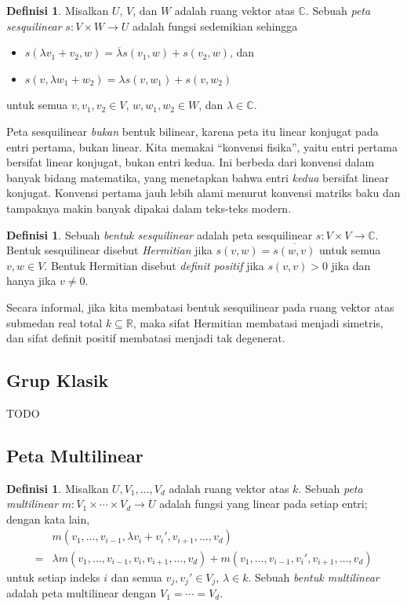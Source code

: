\documentclass[12pt]{article}
\theoremstyle{plain}
\theoremstyle{definition}
\newtheorem{definition}[theorem]{Definisi}
\theoremstyle{remark}
\numberwithin{equation}{section}
\begin{document}
\begin{definition}
Misalkan $U$, $V$, dan $W$ adalah ruang vektor atas $\mathbb{C}$.
Sebuah \emph{peta sesquilinear} $s: V \times W \to U$
adalah fungsi sedemikian sehingga
\begin{itemize}
\item $s(\lambda v_1+v_2,w) = \overline{\lambda} s(v_1,w) + s(v_2,w)$, dan
\item $s(v,\lambda w_1+w_2) = \lambda s(v,w_1) + s(v,w_2)$
\end{itemize}
untuk semua $v,v_1,v_2 \in V$, $w,w_1,w_2 \in W$, dan $\lambda \in \mathbb{C}$.
\end{definition}

Peta sesquilinear \emph{bukan} bentuk bilinear, karena peta itu linear
konjugat pada entri pertama, bukan linear.
Kita memakai “konvensi fisika”, yaitu entri pertama bersifat linear
konjugat, bukan entri kedua. Ini berbeda dari konvensi dalam banyak bidang
matematika, yang menetapkan bahwa entri \emph{kedua} bersifat linear konjugat.
Konvensi pertama jauh lebih alami menurut konvensi matriks baku
dan tampaknya makin banyak dipakai dalam teks-teks modern.

\begin{definition}
Sebuah \emph{bentuk sesquilinear} adalah peta sesquilinear $s: V \times V \to
\mathbb{C}$.
Bentuk sesquilinear disebut \emph{Hermitian} jika $s(v,w)=\overline{s(w,v)}$
untuk semua $v,w \in V$.
Bentuk Hermitian disebut \emph{definit positif} jika $s(v,v) > 0$ jika dan hanya
jika $v \ne 0$.
\end{definition}

Secara informal, jika kita membatasi bentuk sesquilinear pada ruang vektor atas
submedan real total $k \subseteq \mathbb{R}$, maka sifat Hermitian membatasi menjadi simetris,
dan sifat definit positif membatasi menjadi tak degenerat.

\subsection{Grup Klasik}

TODO

\subsection{Peta Multilinear}

\begin{definition}
Misalkan $U,V_1,\ldots, V_d$ adalah ruang vektor atas $k$.
Sebuah \emph{peta multilinear} $m: V_1 \times \cdots \times V_d \to U$
adalah fungsi yang linear pada setiap entri; dengan kata lain,
\begin{align*}
&m(v_1,\ldots,v_{i-1},\lambda v_i + v_i',v_{i+1},\ldots,v_d)\\
=& \lambda m(v_1,\ldots,v_{i-1},v_i,v_{i+1},\ldots,v_d)
+ m(v_1,\ldots,v_{i-1},v_i',v_{i+1},\ldots,v_d)
\end{align*}
untuk setiap indeks $i$ dan semua $v_j,v_j' \in V_j$, $\lambda \in k$.
Sebuah \emph{bentuk multilinear} adalah peta multilinear dengan $V_1 = \cdots = V_d$.
\end{definition}
\end{document}
